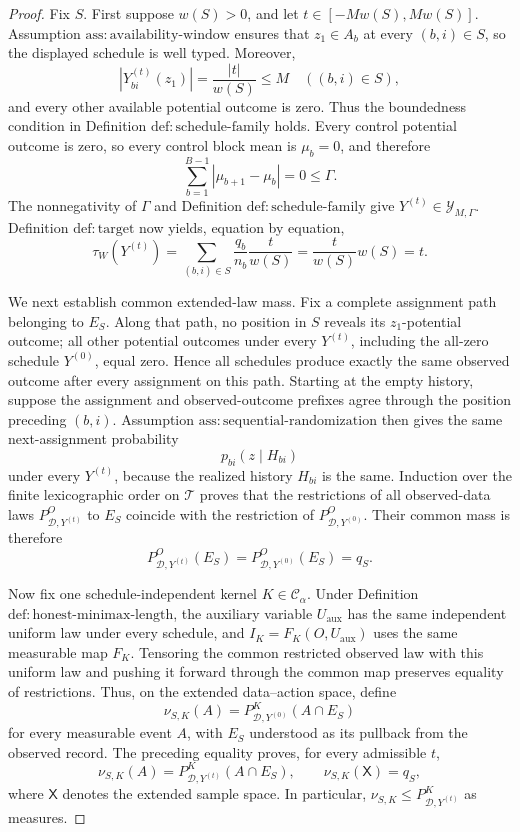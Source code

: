 \documentclass{article}
\begin{document}
\begin{proof}
Fix \(S\).  First suppose \(w(S)>0\), and let \(t\in[-Mw(S),Mw(S)]\).  Assumption \(\mathrm{ass:availability\text{-}window}\) ensures that \(z_1\in A_b\) at every \((b,i)\in S\), so the displayed schedule is well typed.  Moreover,
\[
 \left|Y^{(t)}_{bi}(z_1)\right|=\frac{|t|}{w(S)}\le M
 \quad ((b,i)\in S),
\]
and every other available potential outcome is zero.  Thus the boundedness condition in Definition \(\mathrm{def:schedule\text{-}family}\) holds.  Every control potential outcome is zero, so every control block mean is \(\mu_b=0\), and therefore
\[
 \sum_{b=1}^{B-1}|\mu_{b+1}-\mu_b|=0\le\Gamma.
\]
The nonnegativity of \(\Gamma\) and Definition \(\mathrm{def:schedule\text{-}family}\) give \(Y^{(t)}\in\mathcal Y_{M,\Gamma}\).  Definition \(\mathrm{def:target}\) now yields, equation by equation,
\[
 \tau_W(Y^{(t)})
 =\sum_{(b,i)\in S}\frac{q_b}{n_b}\frac{t}{w(S)}
 =\frac{t}{w(S)}w(S)
 =t.
\]

We next establish common extended-law mass.  Fix a complete assignment path belonging to \(E_S\).  Along that path, no position in \(S\) reveals its \(z_1\)-potential outcome; all other potential outcomes under every \(Y^{(t)}\), including the all-zero schedule \(Y^{(0)}\), equal zero.  Hence all schedules produce exactly the same observed outcome after every assignment on this path.  Starting at the empty history, suppose the assignment and observed-outcome prefixes agree through the position preceding \((b,i)\).  Assumption \(\mathrm{ass:sequential\text{-}randomization}\) then gives the same next-assignment probability
\[
 p_{bi}(z\mid H_{bi})
\]
under every \(Y^{(t)}\), because the realized history \(H_{bi}\) is the same.  Induction over the finite lexicographic order on \(\mathcal T\) proves that the restrictions of all observed-data laws \(P^O_{\mathcal D,Y^{(t)}}\) to \(E_S\) coincide with the restriction of \(P^O_{\mathcal D,Y^{(0)}}\).  Their common mass is therefore
\[
 P^O_{\mathcal D,Y^{(t)}}(E_S)
 =P^O_{\mathcal D,Y^{(0)}}(E_S)
 =q_S.
\]

Now fix one schedule-independent kernel \(K\in\mathcal C_\alpha\).  Under Definition \(\mathrm{def:honest\text{-}minimax\text{-}length}\), the auxiliary variable \(U_{\mathrm{aux}}\) has the same independent uniform law under every schedule, and \(I_K=F_K(O,U_{\mathrm{aux}})\) uses the same measurable map \(F_K\).  Tensoring the common restricted observed law with this uniform law and pushing it forward through the common map preserves equality of restrictions.  Thus, on the extended data--action space, define
\[
 \nu_{S,K}(A)
 =P^K_{\mathcal D,Y^{(0)}}(A\cap E_S)
\]
for every measurable event \(A\), with \(E_S\) understood as its pullback from the observed record.  The preceding equality proves, for every admissible \(t\),
\[
 \nu_{S,K}(A)=P^K_{\mathcal D,Y^{(t)}}(A\cap E_S),
 \qquad
 \nu_{S,K}(\mathsf X)=q_S,
\]
where \(\mathsf X\) denotes the extended sample space.  In particular, \(\nu_{S,K}\le P^K_{\mathcal D,Y^{(t)}}\) as measures.


\end{proof}
\end{document}
